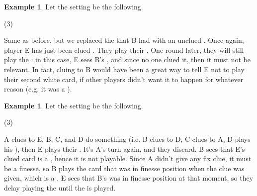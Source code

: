 \documentclass[a4paper]{article}
\theoremstyle{plain}
\theoremstyle{definition}
\newtheorem{example}[theorem]{Example}
\begin{document}
\begin{example}
	
	Let the setting be the following.
	
	\begin{tasks}(3)
		\task[+]      
		\task[A]    
		\task[B]    
		\task[C]    
		\task[D]    
		\task[E]    
	\end{tasks}
	
	Same as before, but we replaced the  that B had with an unclued . Once again, player E has just been clued . They play their . One round later, they will still play the : in this case, E sees B's , and since no one clued it, then it must not be relevant. In fact, cluing  to B would have been a great way to tell E not to play their second white card, if other players didn't want it to happen for whatever reason (e.g. it was a ).
	
\end{example}

\begin{example}
	
	Let the setting be the following.
	
	\begin{tasks}(3)
		\task[+]      
		\task[A]    
		\task[B]    
		\task[C]    
		\task[D]    
		\task[E]    
	\end{tasks}
	
	A clues  to E. B, C, and D do something (i.e. B clues  to D, C clues  to A, D plays his ), then E plays their . It's A's turn again, and they discard. B sees that E's clued card is a , hence it is not playable. Since A didn't give any fix clue, it must be a finesse, so B plays the card that was in finesse position when the  clue was given, which is a . E sees that B's  was in finesse position at that moment, so they delay playing the  until the  is played.
	
\end{example}
\end{document}
